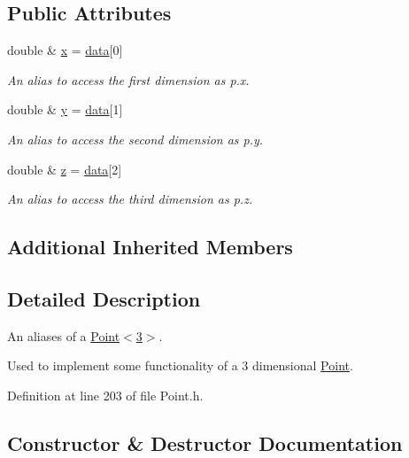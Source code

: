 \subsection*{Public Attributes}
\begin{DoxyCompactItemize}
\item 
double \& \hyperlink{classzbe_1_1_point3_d_af5a1cd56dc21df531bc92ab03efa6ee6}{x} = \hyperlink{classzbe_1_1_point_a44784a8fc0112f976473e8e2da0193e5}{data}\mbox{[}0\mbox{]}
\begin{DoxyCompactList}\small\item\em An alias to access the first dimension as p.\+x. \end{DoxyCompactList}\item 
double \& \hyperlink{classzbe_1_1_point3_d_a06bcb3860ed13dfce2d8e95d81fdbea9}{y} = \hyperlink{classzbe_1_1_point_a44784a8fc0112f976473e8e2da0193e5}{data}\mbox{[}1\mbox{]}
\begin{DoxyCompactList}\small\item\em An alias to access the second dimension as p.\+y. \end{DoxyCompactList}\item 
double \& \hyperlink{classzbe_1_1_point3_d_abfa9463b5314e1dbaa2db879ccbb71a4}{z} = \hyperlink{classzbe_1_1_point_a44784a8fc0112f976473e8e2da0193e5}{data}\mbox{[}2\mbox{]}
\begin{DoxyCompactList}\small\item\em An alias to access the third dimension as p.\+z. \end{DoxyCompactList}\end{DoxyCompactItemize}
\subsection*{Additional Inherited Members}


\subsection{Detailed Description}
An aliases of a \hyperlink{classzbe_1_1_point}{Point$<$3$>$}. 

Used to implement some functionality of a 3 dimensional \hyperlink{classzbe_1_1_point}{Point}. 

Definition at line 203 of file Point.\+h.



\subsection{Constructor \& Destructor Documentation}
\hypertarget{classzbe_1_1_point3_d_ab2ceb379ccb84e342f5dbeeacb6644e5}{}
